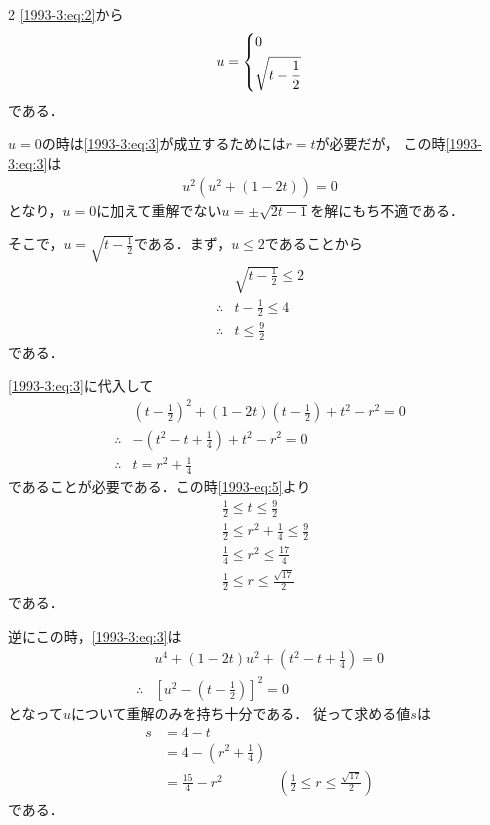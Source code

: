 \documentclass[../../../../main.tex]{subfiles}
\begin{document}
\begin{multicols}{2}
  \cref{1993-3:eq:2}から
  \begin{align*}
    u =
    \begin{dcases}
      0 \\
      \sqrt{t-\frac{1}{2}}
    \end{dcases}
  \end{align*}
  である．

  $u=0$の時は\cref{1993-3:eq:3}が成立するためには$r=t$が必要だが，
  この時\cref{1993-3:eq:3}は
  \begin{align*}
    u^2(u^2+(1-2t))=0
  \end{align*}
  となり，$u=0$に加えて重解でない$u=\pm\sqrt{2t-1}$を解にもち不適である．

  そこで，$u=\sqrt{t-\frac{1}{2}}$である．まず，$u \le 2$であることから
  \begin{align}
     & \sqrt{t-\frac{1}{2}} \le 2          \\
    \therefore
     & t - \frac{1}{2} \le 4               \\
    \therefore
     & t \le \frac{9}{2} \label{1993-eq:5}
  \end{align}
  である．

  \cref{1993-3:eq:3}に代入して
  \begin{align*}
     & \left(t-\frac{1}{2}\right)^2 + (1-2t)\left(t-\frac{1}{2}\right) + t^2 - r^2 = 0 \\
    \therefore
     & -\left(t^2-t+\frac{1}{4}\right) + t^2 - r^2 = 0                                 \\
    \therefore
     & t = r^2 + \frac{1}{4}
  \end{align*}
  であることが必要である．この時\cref{1993-eq:5}より
  \begin{align*}
     & \frac{1}{2} \le t \le \frac{9}{2}                  \\
     & \frac{1}{2} \le  r^2 + \frac{1}{4} \le \frac{9}{2} \\
     & \frac{1}{4} \le  r^2  \le \frac{17}{4}             \\
     & \frac{1}{2} \le  r  \le \frac{\sqrt{17}}{2}
  \end{align*}
  である．

  逆にこの時，\cref{1993-3:eq:3}は
  \begin{align*}
     & u^4 + (1-2t)u^2 + \left(t^2-t + \frac{1}{4}\right) = 0 \\
    \therefore
     & \left[u^2-\left(t-\frac{1}{2}\right)\right]^2 = 0
  \end{align*}
  となって$u$について重解のみを持ち十分である．
  従って求める値$s$は
  \begin{align}
    s
     & = 4 - t                                                                                                           \\
     & = 4 - \left(r^2 + \frac{1}{4}\right)                                                                              \\
     & = \frac{15}{4} - r^2                 & \left(\frac{1}{2} \le  r  \le \frac{\sqrt{17}}{2}\right) \label{1993-eq:6}
  \end{align}
  である．


\end{multicols}
\end{document}
